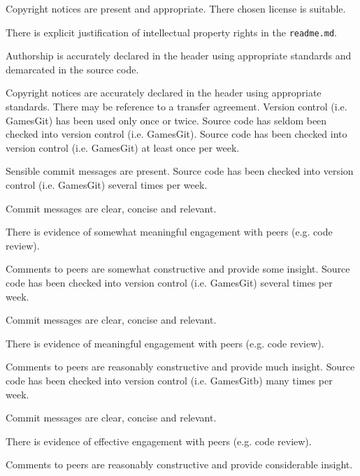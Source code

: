 \documentclass{../../fal_assignment}
\begin{document}
\begin{markingrubric}
            \par Copyright notices are present and appropriate.
        \grade There chosen license is suitable.
            \par There is explicit justification of intellectual property rights in the \texttt{readme.md}.
            \par Authorship is accurately declared in the header using appropriate standards and demarcated in the source code.
            \par Copyright notices are accurately declared in the header using appropriate standards. There may be reference to a transfer agreement.
%
        \grade\fail Version control (i.e. GamesGit) has been used only once or twice.
        \grade Source code has seldom been checked into version control (i.e. GamesGit).
        \grade Source code has been checked into version control (i.e. GamesGit) at least once per week.
            \par Sensible commit messages are present.
        \grade Source code  has been checked into version control (i.e. GamesGit) several times per week.
            \par Commit messages are clear, concise and relevant.
            \par There is evidence of somewhat meaningful engagement with peers (e.g. code review).
            \par Comments to peers are somewhat constructive and provide some insight.
        \grade Source code has been checked into version control (i.e. GamesGit) several times per week.
            \par Commit messages are clear, concise and relevant.
            \par There is evidence of meaningful engagement with peers (e.g. code review).
            \par Comments to peers are reasonably constructive and provide much insight.
        \grade Source code has been checked into version control (i.e. GamesGitb) many times per week.
            \par Commit messages are clear, concise and relevant.
            \par There is evidence of effective engagement with peers (e.g. code review).
            \par Comments to peers are reasonably constructive and provide considerable insight.
%
\end{markingrubric}
\end{document}
